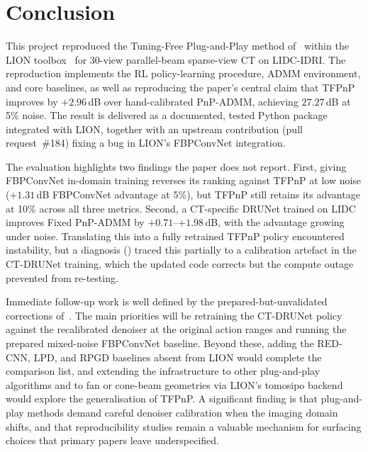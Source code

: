 \chapter{Conclusion}
\label{chap:conclusion}

This project reproduced the Tuning-Free Plug-and-Play method of~\citet{Wei2022TFPnP} within the LION toolbox~\citep{Biguri2024LION} for 30-view parallel-beam sparse-view CT on LIDC-IDRI. The reproduction implements the RL policy-learning procedure, ADMM environment, and core baselines, as well as reproducing the paper's central claim that TFPnP improves by $+2.96$\,dB over hand-calibrated PnP-ADMM, achieving $27.27$\,dB at 5\% noise. The result is delivered as a documented, tested Python package integrated with LION, together with an upstream contribution (pull request~\#184) fixing a bug in LION's FBPConvNet integration.

The evaluation highlights two findings the paper does not report. First, giving FBPConvNet in-domain training reverses its ranking against TFPnP at low noise ($+1.31$\,dB FBPConvNet advantage at 5\%), but TFPnP still retains its advantage at 10\% across all three metrics. Second, a CT-specific DRUNet trained on LIDC improves Fixed PnP-ADMM by $+0.71$--$+1.98$\,dB, with the advantage growing under noise. Translating this into a fully retrained TFPnP policy encountered instability, but a diagnosis () traced this partially to a calibration artefact in the CT-DRUNet training, which the updated code corrects but the compute outage prevented from re-testing.

Immediate follow-up work is well defined by the prepared-but-unvalidated corrections of~. The main priorities will be retraining the CT-DRUNet policy against the recalibrated denoiser at the original action ranges and running the prepared mixed-noise FBPConvNet baseline. Beyond these, adding the RED-CNN, LPD, and RPGD baselines absent from LION would complete the comparison list, and extending the infrastructure to other plug-and-play algorithms and to fan or cone-beam geometries via LION's tomosipo backend would explore the generalisation of TFPnP. A significant finding is that plug-and-play methods demand careful denoiser calibration when the imaging domain shifts, and that reproducibility studies remain a valuable mechanism for surfacing choices that primary papers leave underspecified.
